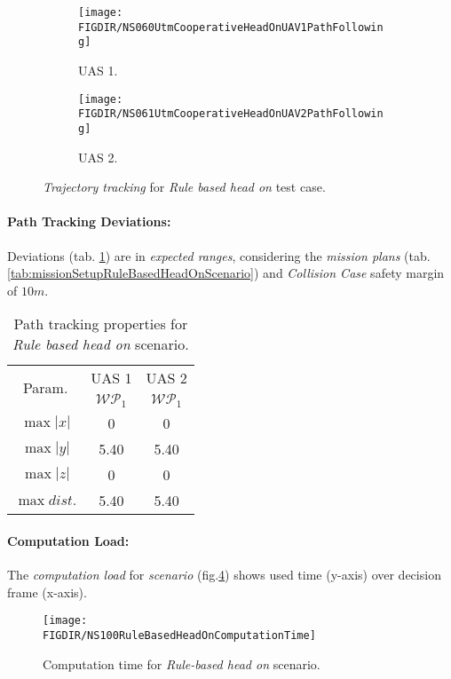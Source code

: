 \begin{figure}[H]
	\centering
    \begin{subfigure}{0.48\textwidth}
    	\centering
        \texttt{[image: \\FIGDIR/NS060UtmCooperativeHeadOnUAV1PathFollowing]}
        \caption{UAS 1.}
        \label{fig:ruleBasedHeadOnUAS1PathTracking}
    \end{subfigure}
    \begin{subfigure}{0.48\textwidth}
    	\centering
        \texttt{[image: \\FIGDIR/NS061UtmCooperativeHeadOnUAV2PathFollowing]} 
        \caption{UAS 2.}
        \label{fig:ruleBasedHeadOnUAS2PathTracking}
    \end{subfigure}
    \caption{\emph{Trajectory tracking} for \emph{Rule based head on} test case. }
    \label{fig:ruleBasedHeadOnTrajectoryTrackingPerformance}
\end{figure}

\paragraph{Path Tracking Deviations:} Deviations (tab. \ref{tab:pathTrackingParametersForRuleBasedHeadOn}) are in \emph{expected ranges}, considering the \emph{mission plans} (tab. \ref{tab:missionSetupRuleBasedHeadOnScenario}) and \emph{Collision Case} safety margin of $10 m$.

\begin{table}[H]
    \centering
    \begin{tabular}{c||c|c}
        \multirow{2}{*}{Param.} & UAS 1     & UAS 2              \\\cline{2-3}
                        & $\mathscr{WP}_1$  & $\mathscr{WP}_1$   \\\hline\hline
          $\max |x|$    & 0                 & 0                  \\\hline
          $\max |y|$    & 5.40              & 5.40              \\\hline
          $\max |z|$    & 0                 & 0                  \\\hline
          $\max dist.$  & 5.40              & 5.40              \\
    \end{tabular}
    \caption{Path tracking properties for \emph{Rule based head on} scenario.}
    \label{tab:pathTrackingParametersForRuleBasedHeadOn}
\end{table}

\newpage
\paragraph{Computation Load:} The \emph{computation load} for \emph{scenario} (fig.\ref{fig:ruleBasedHeadOnComputationTime}) shows used time (y-axis) over decision frame (x-axis).

\begin{figure}[H]
    \centering
    \texttt{[image: \\FIGDIR/NS100RuleBasedHeadOnComputationTime]} 
    \caption{Computation time for \emph{Rule-based head on} scenario.}
    \label{fig:ruleBasedHeadOnComputationTime}
\end{figure}